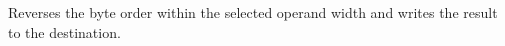 Reverses the byte order within the selected operand width and writes the result to the destination.
